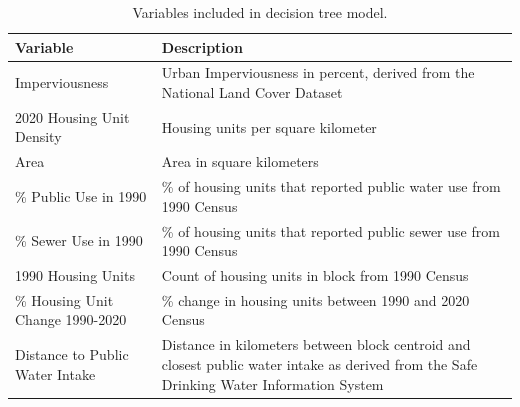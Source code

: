 \documentclass[12pt]{article}
\begin{document}
\begin{longtable}{l>{\raggedright\arraybackslash}p{300px}}

\caption{\label{tbl-dtvars}Variables included in decision tree model.}

\tabularnewline

\toprule
Variable & Description \\ 
\midrule\addlinespace[2.5pt]
Imperviousness & Urban Imperviousness in percent, derived from the National Land Cover Dataset \\ 
2020 Housing Unit Density & Housing units per square kilometer \\ 
Area & Area in square kilometers \\ 
\% Public Use in 1990 & \% of housing units that reported public water use from 1990 Census \\ 
\% Sewer Use in 1990 & \% of housing units that reported public sewer use from 1990 Census \\ 
1990 Housing Units & Count of housing units in block from 1990 Census \\ 
\% Housing Unit Change 1990-2020 & \% change in housing units between 1990 and 2020 Census \\ 
Distance to Public Water Intake & Distance in kilometers between block centroid and closest public water intake as derived from the Safe Drinking Water Information System \\ 
\bottomrule

\end{longtable}
\end{document}
